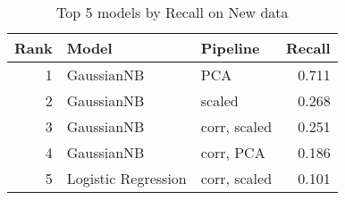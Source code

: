 \begin{table}[!htb]
\caption{Top 5 models by Recall on New data}
\label{table-top-5-recall-new}
\centering
\begin{tabular}{rllr}
\toprule
Rank & Model & Pipeline & Recall \\
\midrule
1 & GaussianNB & PCA & 0.711 \\
2 & GaussianNB & scaled & 0.268 \\
3 & GaussianNB & corr, scaled & 0.251 \\
4 & GaussianNB & corr, PCA & 0.186 \\
5 & Logistic Regression & corr, scaled & 0.101 \\
\bottomrule
\end{tabular}
\end{table}
